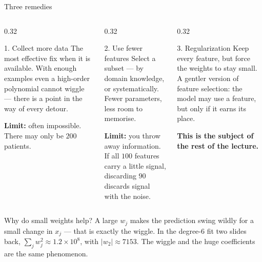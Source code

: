 \documentclass[aspectratio=169,10pt]{beamer}
\begin{document}
\begin{frame}{Three remedies}
  \footnotesize
  \begin{columns}[T,onlytextwidth]
    \begin{column}{0.32\textwidth}
      \begin{block}{1. Collect more data}
        The most effective fix when it is available. With enough examples even a
        high-order polynomial cannot wiggle --- there is a point in the way of every
        detour.
        \par\vspace{1mm}
        \textbf{Limit:} often impossible. There may only be $200$ patients.
      \end{block}
    \end{column}
    \begin{column}{0.32\textwidth}
      \begin{block}{2. Use fewer features}
        Select a subset --- by domain knowledge, or systematically. Fewer parameters, less
        room to memorise.
        \par\vspace{1mm}
        \textbf{Limit:} you throw away information. If all $100$ features carry a little
        signal, discarding $90$ discards signal with the noise.
      \end{block}
    \end{column}
    \begin{column}{0.32\textwidth}
      \begin{block}{3. Regularization}
        Keep every feature, but force the weights to stay small. A gentler version of
        feature selection: the model may use a feature, but only if it earns its place.
        \par\vspace{1mm}
        \textbf{This is the subject of the rest of the lecture.}
      \end{block}
    \end{column}
  \end{columns}
  \vspace{1mm}
  \begin{keyidea}
    Why do small weights help? A large $w_j$ makes the prediction swing wildly for a small
    change in $x_j$ --- that is exactly the wiggle. In the degree-$6$ fit two slides back,
    $\sum_j w_j^2 \approx 1.2\times10^{8}$, with $|w_2| \approx 7153$. The wiggle and the
    huge coefficients are the same phenomenon.
  \end{keyidea}
\end{frame}
\end{document}
